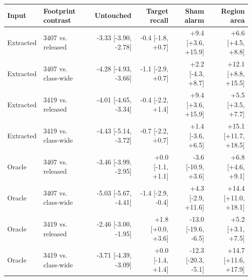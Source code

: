 \begin{tabular}{llrrrr}
\toprule
Input & Footprint contrast & Untouched & Target recall & Sham alarm & Region area \\
\midrule
Extracted & 3407 vs. released & -3.33 [-3.90, -2.78] & -0.4 [-1.8, +0.7] & +9.4 [+3.6, +15.9] & +6.6 [+4.5, +8.8] \\
Extracted & 3407 vs. class-wide & -4.28 [-4.93, -3.66] & -1.1 [-2.9, +0.7] & +2.2 [-4.3, +8.7] & +12.1 [+8.8, +15.5] \\
Extracted & 3419 vs. released & -4.01 [-4.65, -3.34] & -0.4 [-2.2, +1.4] & +9.4 [+3.6, +15.9] & +5.5 [+3.5, +7.7] \\
Extracted & 3419 vs. class-wide & -4.43 [-5.14, -3.72] & -0.7 [-2.2, +0.7] & +1.4 [-3.6, +6.5] & +15.1 [+11.7, +18.5] \\
\midrule
Oracle & 3407 vs. released & -3.46 [-3.99, -2.95] & +0.0 [-1.1, +1.1] & -3.6 [-10.9, +3.6] & +6.8 [+4.6, +9.1] \\
Oracle & 3407 vs. class-wide & -5.03 [-5.67, -4.41] & -1.4 [-2.9, -0.4] & +4.3 [-2.9, +11.6] & +14.4 [+11.0, +18.1] \\
Oracle & 3419 vs. released & -2.46 [-3.00, -1.95] & +1.8 [+0.0, +3.6] & -13.0 [-19.6, -6.5] & +5.2 [+3.1, +7.5] \\
Oracle & 3419 vs. class-wide & -3.71 [-4.39, -3.09] & +0.0 [-1.4, +1.4] & -12.3 [-20.3, -5.1] & +14.7 [+11.6, +17.9] \\
\bottomrule
\end{tabular}
